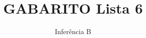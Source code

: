 \documentclass[10pt,brazil,addpoints]{exam}
\begin{document}
\title{GABARITO Lista 6}


\author{
Inferência B\\
  \date{}
}


\maketitle
\end{document}
